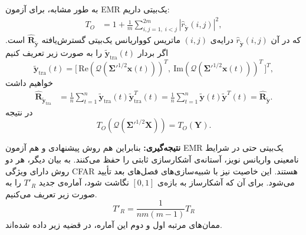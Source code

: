 به طور مشابه، برای آزمون EMR یک‌بیتی داریم:
\begin{align}
	T_{O}
	&=1+\frac{1}{m}\sum_{i,j=1,\; i<j}^{2m}
	|\hat r_{\tilde{\mathbf{y}}}(i,j)|^{2}, \label{eq:cfar3}
\end{align}
که در آن 
$\hat r_{\tilde{\mathbf{y}}}(i,j)$ 
درایه‌ی $(i,j)$ ماتریس کوواریانس یک‌بیتی گسترش‌یافته
$\hat{\mathbf{R}}_{\tilde{\mathbf{y}}}$ 
است.  
اگر بردار 
$\tilde{\mathbf{y}}_{\mathrm{tra}}(t)$ 
را به صورت زیر تعریف کنیم
\[
\tilde{\mathbf{y}}_{\mathrm{tra}}(t)=
\big[\,\mathrm{Re}(\mathcal{Q}(\mathbf{\Sigma}'^{1/2}\mathbf{x}(t)))^{T},~
\mathrm{Im}(\mathcal{Q}(\mathbf{\Sigma}'^{1/2}\mathbf{x}(t)))^{T}\,\big]^{T},
\]
خواهیم داشت
\begin{align}
	\hat{\mathbf{R}}_{\tilde{\mathbf{y}}_{\mathrm{tra}}}
	&=\frac{1}{n}\sum_{t=1}^{n}\tilde{\mathbf{y}}_{\mathrm{tra}}(t)\tilde{\mathbf{y}}_{\mathrm{tra}}^{T}(t)
	=\frac{1}{n}\sum_{t=1}^{n}\tilde{\mathbf{y}}(t)\tilde{\mathbf{y}}^{T}(t)
	=\hat{\mathbf{R}}_{\tilde{\mathbf{y}}}. \label{eq:cfar4}
\end{align}
در نتیجه
\[
T_{O}\!\left(\mathcal{Q}(\mathbf{\Sigma}'^{1/2}\mathbf{X})\right)=T_{O}(\mathbf{Y}).
\]

\noindent\textbf{نتیجه‌گیری:}  
بنابراین هم روش پیشنهادی و هم آزمون EMR یک‌بیتی حتی در شرایط نامعینی واریانس نویز، آستانه‌ی آشکارسازی ثابتی را حفظ می‌کنند.  
به بیان دیگر، هر دو روش دارای ویژگی CFAR هستند. این خاصیت نیز با شبیه‌سازی‌های فصل‌های بعد تأیید می‌شود.
برای آن که آشکارساز به بازه‌ی 
$[0, 1]$
نگاشت شود، آماره‌ی جدید
$T'_R$
را به صورت زیر تعریف می‌کنیم.
\begin{equation}
	T'_R=\frac{1}{nm(m-1)}T_R \label{eq:TRPrime}
\end{equation}
 ممان‌های مرتبه اول و دوم این آماره، در قضیه زیر داده شده‌اند.

